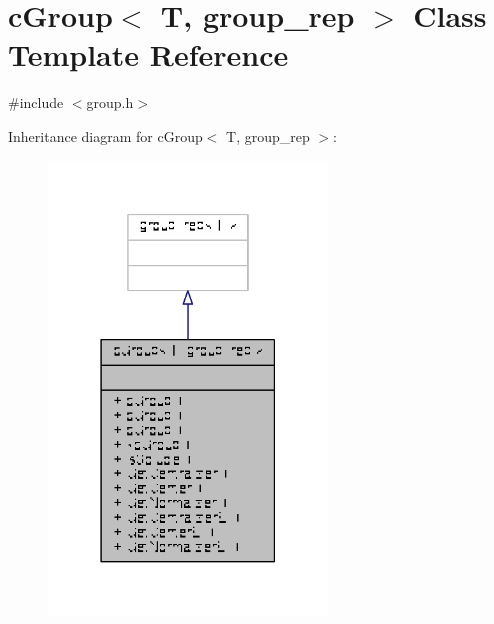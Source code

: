 \hypertarget{classcGroup}{\section{c\-Group$<$ T, group\-\_\-rep $>$ Class Template Reference}
\label{classcGroup}
}


{\ttfamily \#include $<$group.\-h$>$}



Inheritance diagram for c\-Group$<$ T, group\-\_\-rep $>$\-:
\nopagebreak
\begin{figure}[H]
\begin{center}
\leavevmode
\includegraphics[width=210pt]{classcGroup__inherit__graph}
\end{center}
\end{figure}


